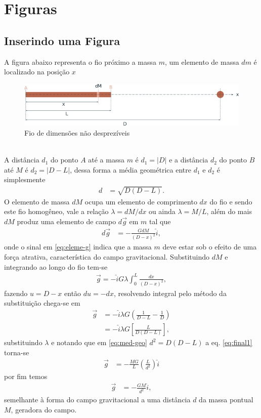 \section{Figuras}
\lipsum[8-9]
\subsection{Inserindo uma Figura}
A figura abaixo representa o fio próximo a massa $m$, um elemento de massa $dm$ é localizado na posição $x$
\begin{figure}[!h]
    \center
    \includegraphics[scale=.7]{elementos/02-textual/fig/fio.png}
    \caption{Fio de dimensões não desprezíveis}
    \label{fig:1}
\end{figure}\\
A distância $d_1$ do ponto $A$ até a massa $m$ é $d_{1}=\vert D\vert$ e a distância $d_2$ do ponto $B$ até $M$ é $d_{2}=\vert D-L\vert$, dessa forma a média geométrica entre $d_1$ e $d_2$ é simplesmente
		\begin{align}
			d&=\sqrt{D(D-L)}.
			\label{eq:med-geo}
		\end{align}
O elemento de massa $dM$ ocupa um elemento de comprimento $dx$ do fio e sendo este fio homogêneo, vale a relação $\lambda=dM/dx$ ou ainda $\lambda=M/L$, além do mais $dM$ produz uma elemento de campo $d\vec{g}$ em $m$ tal que
		\begin{align}
			d\vec{g}&=-\frac{GdM}{(D-x)^2}\hat{i},
			\label{eq:eleme-g}
		\end{align}
onde o sinal em \eqref{eq:eleme-g} indica que a massa $m$ deve estar sob o efeito de uma força atrativa, característica do campo gravitacional. Substituindo $dM$ e integrando ao longo do fio tem-se
		\begin{align}
			\vec{g}=-\hat{i}G\lambda\int_{0}^{L}\frac{dx}{(D-x)^2},
			\label{eq:int1}
		\end{align}
fazendo $u=D-x$ então $du=-dx$, resolvendo integral pelo método da substituição chega-se em
		\begin{align}
			\vec{g}&=-\hat{i}\lambda G\left(\frac{1}{D-L}-\frac{1}{D}\right)\nonumber\\
				   &=-\hat{i}\lambda G\left[\frac{L}{D(D-L)}\right],
		\label{eq:final1}
		\end{align}
substituindo $\lambda$ e notando que em \eqref{eq:med-geo} $d^{2}=D(D-L)$ a eq. \eqref{eq:final1} torna-se
		\begin{align}
			\vec{g}&=-\frac{MG}{L}\left(\frac{L}{d^2}\right)\hat{i}
		\end{align}
por fim temos
		\begin{align}
			\vec{g}&=-\frac{GM}{d^2}\hat{i},
		\end{align}
semelhante à forma do campo gravitacional a uma distância $d$ da massa pontual $M$, geradora do campo.
    